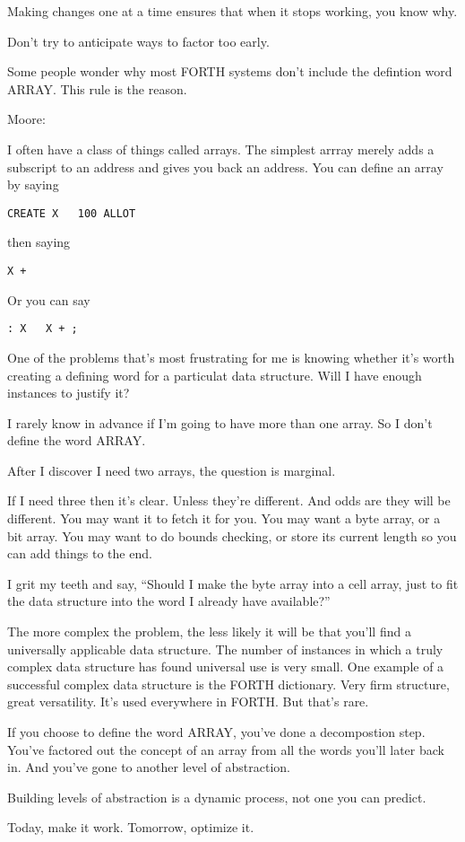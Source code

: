 Making changes one at a time ensures that when it stops working, you know why.

\begin{tip}
Don't try to anticipate ways to factor too early.
\end{tip}
Some people wonder why most FORTH systems don't include the defintion word ARRAY. This rule is the reason.

\bigskip
\blackline{2ex}
\noindent Moore:
\begin{tfquot}
I often have a class of things called arrays. The simplest arrray
merely adds a subscript to an address and gives you back an
address. You can define an array by saying
\begin{verbatim}
CREATE X   100 ALLOT
\end{verbatim}
then saying
\begin{verbatim}
X +
\end{verbatim}
Or you can say
\begin{verbatim}
: X   X + ;
\end{verbatim}
One of the problems that's most frustrating for me is knowing whether
it's worth creating a defining word for a particulat data
structure. Will I have enough instances to justify it?

I rarely know in advance if I'm going to have more than one array. So
I don't define the word ARRAY.

After I discover I need two arrays, the question is marginal.

If I need three then it's clear. Unless they're different. And odds
are they will be different. You may want it to fetch it for you. You
may want a byte array, or a bit array. You may want to do bounds
checking, or store its current length so you can add things to the
end.

I grit my teeth and say, ``Should I make the byte array into a cell
array, just to fit the data structure into the word I already have
available?''

The more complex the problem, the less likely it will be that you'll
find a universally applicable data structure. The number of instances
in which a truly complex data structure has found universal use is
very small. One example of a successful complex data structure is the
FORTH dictionary. Very firm structure, great versatility. It's used
everywhere in FORTH. But that's rare.

If you choose to define the word ARRAY, you've done a decompostion
step. You've factored out the concept of an array from all the words
you'll later back in. And you've gone to another level of abstraction.

Building levels of abstraction is a dynamic process, not one you can predict.
\end{tfquot}
\blackline{1ex}
\begin{tip}
Today, make it work. Tomorrow, optimize it.
\end{tip}

